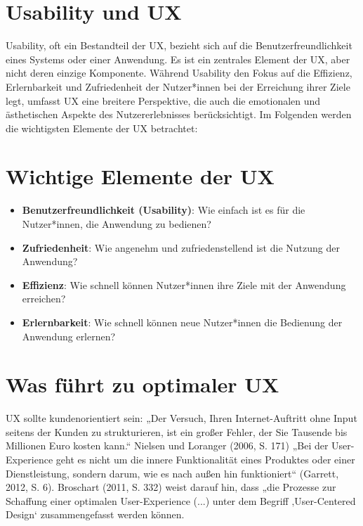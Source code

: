 \documentclass[a4paper,12pt]{report}
\begin{document}
\section{Usability und UX}
Usability, oft ein Bestandteil der UX, bezieht sich auf die Benutzerfreundlichkeit eines Systems oder einer Anwendung. Es ist ein zentrales Element der UX, aber nicht deren einzige Komponente. Während Usability den Fokus auf die Effizienz, Erlernbarkeit und Zufriedenheit der Nutzer*innen bei der Erreichung ihrer Ziele legt, umfasst UX eine breitere Perspektive, die auch die emotionalen und ästhetischen Aspekte des Nutzererlebnisses berücksichtigt. Im Folgenden werden die wichtigsten Elemente der UX betrachtet:
 

\section{Wichtige Elemente der UX}
\begin{itemize}
    \item \textbf{Benutzerfreundlichkeit (Usability)}: Wie einfach ist es für die Nutzer*innen, die Anwendung zu bedienen?
    \item \textbf{Zufriedenheit}: Wie angenehm und zufriedenstellend ist die Nutzung der Anwendung?
    \item \textbf{Effizienz}: Wie schnell können Nutzer*innen ihre Ziele mit der Anwendung erreichen?
    \item \textbf{Erlernbarkeit}: Wie schnell können neue Nutzer*innen die Bedienung der Anwendung erlernen?
\end{itemize}

\section{Was führt zu optimaler UX}
UX sollte kundenorientiert sein: „Der Versuch, Ihren Internet-Auftritt ohne Input seitens der Kunden zu strukturieren, ist ein großer Fehler, der Sie Tausende bis Millionen Euro kosten kann.“ Nielsen und Loranger (2006, S. 171) „Bei der User-Experience geht es nicht um die innere Funktionalität eines Produktes oder einer Dienstleistung, sondern darum, wie es nach außen hin funktioniert“ (Garrett, 2012, S. 6). Broschart (2011, S. 332) weist darauf hin, dass „die Prozesse zur Schaffung einer optimalen User-Experience (...) unter dem Begriff ‚User-Centered Design‘ zusammengefasst werden können.
 
\end{document}
